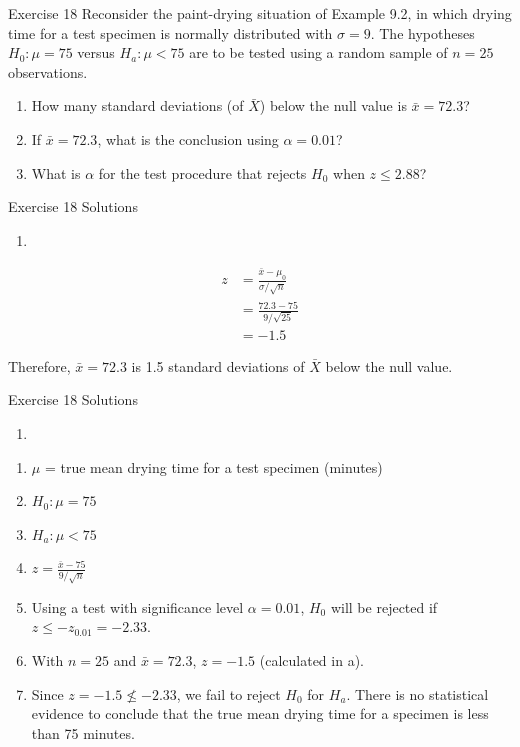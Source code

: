 \documentclass[
  ignorenonframetext,
]{beamer}
\providecommand{\tightlist}{%
  \setlength{\itemsep}{0pt}\setlength{\parskip}{0pt}}\usepackage{longtable,booktabs,array}
\begin{document}
\begin{frame}{Exercise 18}
\protect\hypertarget{exercise-18}{}
Reconsider the paint-drying situation of Example 9.2, in which drying
time for a test specimen is normally distributed with \(\sigma = 9\).
The hypotheses \(H_{0}: \mu = 75\) versus \(H_{a}: \mu < 75\) are to be
tested using a random sample of \(n = 25\) observations.

\begin{enumerate}[<+->]
[a.]
\tightlist
\item
  How many standard deviations (of \(\bar{X}\)) below the null value is
  \(\bar{x} = 72.3\)?
\item
  If \(\bar{x} = 72.3\), what is the conclusion using \(\alpha = 0.01\)?
\item
  What is \(\alpha\) for the test procedure that rejects \(H_{0}\) when
  \(z \leq 2.88\)?
\end{enumerate}
\end{frame}

\begin{frame}{Exercise 18 Solutions}
\protect\hypertarget{exercise-18-solutions}{}
\begin{enumerate}[<+->]
[a.]
\tightlist
\item
\end{enumerate}

\[
\begin{aligned}
z &= \frac{\bar{x} - \mu_{0}}{\sigma/\sqrt{n}} \\
&= \frac{72.3 - 75}{9/\sqrt{25}} \\
&= -1.5
\end{aligned}
\]

Therefore, \(\bar{x} = 72.3\) is 1.5 standard deviations of \(\bar{X}\)
below the null value.
\end{frame}

\begin{frame}{Exercise 18 Solutions}
\protect\hypertarget{exercise-18-solutions-1}{}
\begin{enumerate}[<+->]
[a.]
\setcounter{enumi}{1}
\tightlist
\item
\end{enumerate}

\begin{enumerate}[<+->]
\tightlist
\item
  \(\mu\) = true mean drying time for a test specimen (minutes)
\item
  \(H_{0}: \mu = 75\)
\item
  \(H_{a}: \mu < 75\)
\item
  \(z = \frac{\bar{x} - 75}{9/\sqrt{n}}\)
\item
  Using a test with significance level \(\alpha = 0.01\), \(H_{0}\) will
  be rejected if \(z \leq -z_{0.01} = -2.33\).
\item
  With \(n=25\) and \(\bar{x} = 72.3\), \(z = -1.5\) (calculated in a).
\item
  Since \(z = -1.5 \nleq -2.33\), we fail to reject \(H_{0}\) for
  \(H_{a}\). There is no statistical evidence to conclude that the true
  mean drying time for a specimen is less than 75 minutes.
\end{enumerate}
\end{frame}
\end{document}
